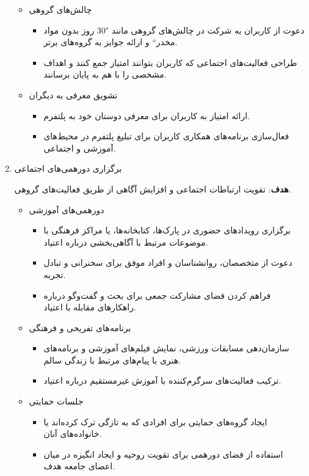 \documentclass[dvipsnames, svgnames, x11names, 11pt]{article}
\begin{document}
\begin{enumerate}
\begin{itemize}
\item 
چالش‌های گروهی
\begin{itemize}
\item 
دعوت از کاربران به شرکت در چالش‌های گروهی مانند "30 روز بدون مواد مخدر`` و ارائه جوایز به گروه‌های برتر.  
\item 
طراحی فعالیت‌های اجتماعی که کاربران بتوانند امتیاز جمع کنند و اهداف مشخصی را با هم به پایان برسانند.  
\end{itemize}

\item 
تشویق معرفی به دیگران
\begin{itemize}
\item 
ارائه امتیاز به کاربران برای معرفی دوستان خود به پلتفرم.  
\item 
فعال‌سازی برنامه‌های همکاری کاربران برای تبلیغ پلتفرم در محیط‌های آموزشی و اجتماعی.  
\end{itemize}
\end{itemize}

\item 
برگزاری دورهمی‌های اجتماعی  

\textbf{هدف}:
تقویت ارتباطات اجتماعی و افزایش آگاهی از طریق فعالیت‌های گروهی.  

\begin{itemize}
\item 
دورهمی‌های آموزشی
\begin{itemize}
\item 
برگزاری رویدادهای حضوری در پارک‌ها، کتابخانه‌ها، یا مراکز فرهنگی با موضوعات مرتبط با آگاهی‌بخشی درباره اعتیاد.  
\item 
دعوت از متخصصان، روانشناسان و افراد موفق برای سخنرانی و تبادل تجربه.  
\item 
فراهم کردن فضای مشارکت جمعی برای بحث و گفت‌وگو درباره راهکارهای مقابله با اعتیاد.  
\end{itemize}

\item 
برنامه‌های تفریحی و فرهنگی
\begin{itemize}
\item 
سازمان‌دهی مسابقات ورزشی، نمایش فیلم‌های آموزشی و برنامه‌های هنری با پیام‌های مرتبط با زندگی سالم.  
\item 
ترکیب فعالیت‌های سرگرم‌کننده با آموزش غیرمستقیم درباره اعتیاد.  
\end{itemize}

\item 
جلسات حمایتی
\begin{itemize}
\item 
ایجاد گروه‌های حمایتی برای افرادی که به تازگی ترک کرده‌اند یا خانواده‌های آنان.  
\item 
استفاده از فضای دورهمی برای تقویت روحیه و ایجاد انگیزه در میان اعضای جامعه هدف.  
\end{itemize}
\end{itemize}


\end{enumerate}
\end{document}
